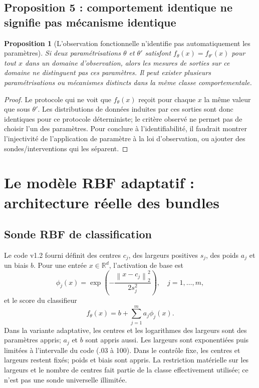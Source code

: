 \documentclass[11pt,a4paper,oneside]{report}
\newtheorem{proposition}{Proposition}[chapter]
\newcommand{\R}{\mathbb R}
\newcommand{\norm}[1]{\left\lVert #1\right\rVert}
\begin{document}
\section{Proposition 5 : comportement identique ne signifie pas mécanisme identique}
\begin{proposition}[L'observation fonctionnelle n'identifie pas automatiquement les paramètres]
Si deux paramétrisations \(\theta\) et \(\theta'\) satisfont \(f_\theta(x)=f_{\theta'}(x)\) pour tout \(x\) dans un domaine d'observation, alors les mesures de sorties sur ce domaine ne distinguent pas ces paramètres. Il peut exister plusieurs paramétrisations ou mécanismes distincts dans la même classe comportementale.
\end{proposition}
\begin{proof}
Le protocole qui ne voit que \(f_\theta(x)\) reçoit pour chaque \(x\) la même valeur que sous \(\theta'\). Les distributions de données induites par ces sorties sont donc identiques pour ce protocole déterministe; le critère observé ne permet pas de choisir l'un des paramètres. Pour conclure à l'identifiabilité, il faudrait montrer l'injectivité de l'application de paramètre à la loi d'observation, ou ajouter des sondes/interventions qui les séparent.\end{proof}

\chapter{Le modèle RBF adaptatif : architecture réelle des bundles}
\section{Sonde RBF de classification}
Le code v1.2 fourni définit des centres \(c_j\), des largeurs positives \(s_j\), des poids \(a_j\) et un biais \(b\). Pour une entrée \(x\in\R^d\), l'activation de base est
\[
\phi_j(x)=\exp\!\left(-\frac{\norm{x-c_j}_2^2}{2s_j^2}\right),\quad j=1,\ldots,m,
\]
et le score du classifieur
\[
f_\theta(x)=b+\sum_{j=1}^{m}a_j\phi_j(x).
\]
Dans la variante adaptative, les centres et les logarithmes des largeurs sont des paramètres appris; \(a_j\) et \(b\) sont appris aussi. Les largeurs sont exponentiées puis limitées à l'intervalle du code (.03 à 100). Dans le contrôle fixe, les centres et largeurs restent fixés; poids et biais sont appris. La restriction matérielle sur les largeurs et le nombre de centres fait partie de la classe effectivement utilisée; ce n'est pas une sonde universelle illimitée.
\end{document}
